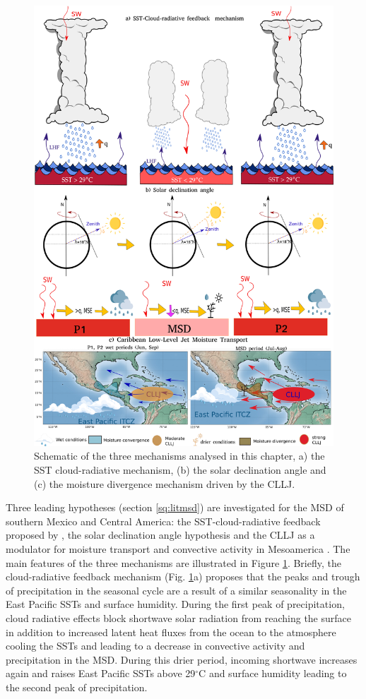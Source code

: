  \begin{figure}[t!]
 \centering
\includegraphics[width=0.84\linewidth]{figures/msd_all_schematics.png}
\caption[Schematics of MSD mechanisms.]{Schematic of the three mechanisms analysed in this chapter, a) the SST cloud-radiative mechanism, (b) the solar declination angle and (c) the moisture divergence mechanism driven by the CLLJ.}
\label{fig:schematic_msd}
\end{figure} 
 

Three leading hypotheses (section \ref{sq:litmsd}) are investigated for the MSD of southern Mexico and Central America:
the SST-cloud-radiative feedback proposed by \cite{magana1999}, the solar declination angle hypothesis \citep{karnauskas2013} and the CLLJ as a modulator for moisture transport and convective activity in Mesoamerica \citep{herrera2015,zermeno2019}.
The main features of the three mechanisms are illustrated in Figure \ref{fig:schematic_msd}. 
Briefly, the cloud-radiative feedback mechanism (Fig. \ref{fig:schematic_msd}a) proposes that the peaks and trough of precipitation in the seasonal cycle are a result of a similar seasonality in the East Pacific SSTs and surface humidity. 
During the first peak of precipitation, cloud radiative effects block shortwave solar radiation from reaching the surface in addition to increased latent heat fluxes from the ocean to the atmosphere cooling the SSTs and leading to a decrease in convective activity and precipitation in the MSD.
During this drier period, incoming shortwave increases again and raises East Pacific SSTs above 29$^\circ$C and surface humidity leading to the second peak of precipitation. %


